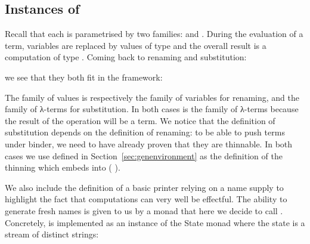 
\subsection{Instances of }

Recall that each  is parametrised by two families: 
and . During the evaluation of a term, variables are replaced by
values of type  and the overall result is a computation of type .
Coming back to renaming and substitution:
\begin{center}
  \begin{minipage}{0.6\textwidth}
  \end{minipage}
\end{center}
we see that they both fit in the
\semrec{} framework:
\begin{center}
  \begin{minipage}{0.5\linewidth}
  \end{minipage}%
  \begin{minipage}{0.5\linewidth}
  \end{minipage}
\end{center}
The family  of values is respectively the family
of variables for renaming, and the family of λ-terms for substitution.
In both cases  is the family of λ-terms because the result of the
operation will be a term.
We notice that the definition of substitution depends on
the definition of renaming: to be able to push terms under binder, we need to
have already proven that they are thinnable.
In both cases we use  defined in Section~\ref{sec:genenvironment} as the definition of the
thinning which embeds  into {(  )}.

\label{section:printing}
We also include the definition of a basic printer relying on a name
supply to highlight the fact that computations can very well be
effectful. The ability to generate fresh names is given to us by a
monad that here we decide to call . Concretely,  is implemented as an instance of the State monad where
the state is a stream of distinct strings:
\begin{center}
  \begin{minipage}{0.5\textwidth}
  \end{minipage}
\end{center}

